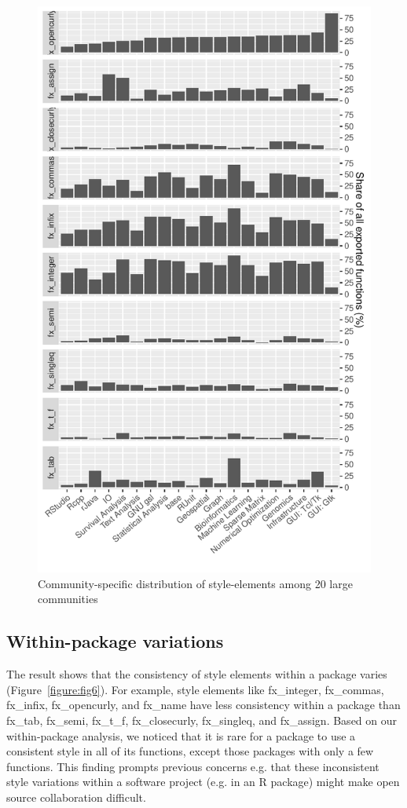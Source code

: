 \begin{figure}[htbp]
  \centering
  \includegraphics{fig5}
  \caption{Community-specific distribution of style-elements among 20 large communities}
  \label{figure:fig5}
\end{figure}

\subsection{Within-package variations}

The result shows that the consistency of style elements within a package varies (Figure~\ref{figure:fig6}). For example, style elements like fx\_integer, fx\_commas, fx\_infix, fx\_opencurly, and fx\_name have less consistency within a package than fx\_tab, fx\_semi, fx\_t\_f, fx\_closecurly, fx\_singleq, and fx\_assign. Based on our within-package analysis, we noticed that it is rare for a package to use a consistent style in all of its functions, except those packages with only a few functions. This finding prompts previous concerns e.g. \citet{oman, elish, wang, gillespie2016efficient} that these inconsistent style variations within a software project (e.g. in an R package) might make open source collaboration difficult.

